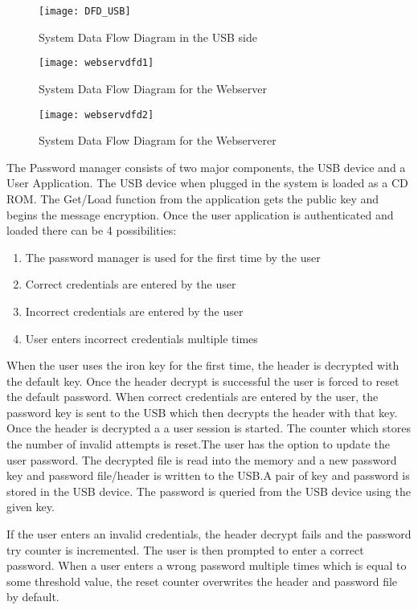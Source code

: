 \begin{figure*}
    \centering
    \texttt{[image: DFD\_USB]}
    \caption{System Data Flow Diagram in the USB side}
    \label{fig:dfd_usb}
\end{figure*}

\begin{figure*}
    \centering
    \texttt{[image: webservdfd1]}
    \caption{System Data Flow Diagram for the Webserver}
    \label{fig:wsdfd1}
\end{figure*}


\begin{figure*}
    \centering
    \texttt{[image: webservdfd2]}
    \caption{System Data Flow Diagram for the Webserverer}
    \label{fig:wsdfd2}
\end{figure*}

The Password manager consists of two major components, the USB device and a User
Application. The USB device when plugged in the system is loaded as a CD
ROM. The Get/Load function from the application gets the public key and begins
the message
encryption. Once the user application is authenticated and loaded there can be 4
possibilities:
\begin{enumerate}
\item The password manager is used for the first time by the user
\item Correct credentials are entered by the user
\item Incorrect credentials are entered by the user
\item User enters incorrect credentials multiple times
\end{enumerate}

When the user uses the iron key for the first time, the header is decrypted with
the default key. Once the header decrypt is successful the user is forced to
reset the default password. When correct credentials are entered by the user,
the password key is sent to the USB which then decrypts the header with that
key.  Once the header is decrypted a a user session is started. The counter
which stores the number of invalid attempts is reset.The user has the option to
update the user password. The decrypted file is read into the memory and a new
password key and password file/header is written to the USB.A pair of key and
password is stored in the USB device. The password is queried from the USB
device using the given key.

If the user enters an invalid credentials, the header decrypt fails and the
password try counter is incremented. The user is
then prompted to enter a correct password. When a user enters a wrong password
multiple times which is equal to some threshold value, the reset counter
overwrites the header and password file by default.

